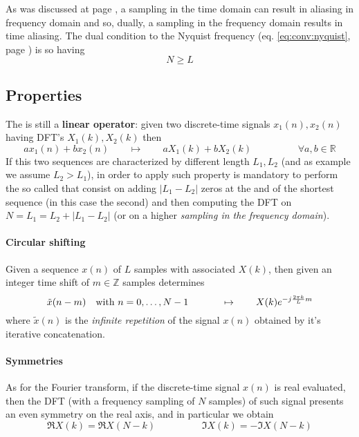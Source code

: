 		As was discussed at page \pageref{sec:conv:nyquist}, a sampling in the time domain can result in aliasing in frequency domain and so, dually, a sampling in the frequency domain results in time aliasing. The dual condition to the Nyquist frequency (eq. \ref{eq:conv:nyquist}, page \pageref{eq:conv:nyquist}) is so having 
		\begin{equation}
			N\geq L
		\end{equation}
	
	\subsection{Properties}
		
		The \dft is still a \textbf{linear operator}: given two discrete-time signals $x_1(n),x_2(n)$ having DFT's $X_1(k), X_2(k)$ then
		\begin{equation}
			ax_1(n) + b x_2(n) \qquad \mapsto \qquad aX_1(k) + bX_2(k) \hspace{2cm} \forall a,b \in \mathds R
		\end{equation}
		If this two sequences are characterized by different length $L_1,L_2$ (and as example we assume $L_2>L_1$), in order to apply such property is mandatory to perform the so called  that consist on adding $|L_1-L_2|$ zeros at the and of the shortest sequence (in this case the second) and then computing the DFT on $N = L_1 = L_2 + |L_1-L_2|$ (or on a higher \textit{sampling in the frequency domain}).
		
		\paragraph{Circular shifting} Given a sequence $x(n)$ of $L$ samples with associated \dft $X(k)$, then given an integer time shift of $m\in \mathds Z$ samples determines
		\begin{equation}
			\tilde x(n-m) \quad \textrm{with } n =0,\dots, N-1 \hspace{1.2cm} \mapsto \qquad X(k) e^{-j\frac{2\pi k}{L}m}
		\end{equation} 
		where $\tilde x(n)$ is the \textit{infinite repetition} of the signal $x(n)$ obtained by it's iterative concatenation.
		
		\paragraph{Symmetries} As for the Fourier transform, if the discrete-time signal $x(n)$ is real evaluated, then the DFT (with a frequency sampling of $N$ samples) of such signal presents an even symmetry on the real axis, and in particular we obtain
		\begin{equation}
			\Re{X(k)} = \Re{X(N-k)} \hspace{2cm} \Im{X(k)} = - \Im{X(N-k)}
		\end{equation}
		
